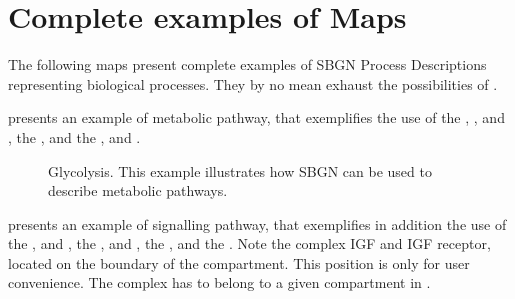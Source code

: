 \chapter{Complete examples of \PD Maps}

The following maps present complete examples of SBGN Process Descriptions representing biological processes. They by no mean exhaust the possibilities of  \SBGNPDLone.

 presents an example of metabolic pathway, that exemplifies the use of the  , , and , the  , and the  ,  and .

\begin{figure}[htb]
\begin{center}
\caption{Glycolysis. This example illustrates how SBGN can be used to describe metabolic pathways.}
\label{fig:glycolysis}
\end{center}
\end{figure}

 presents an example of signalling pathway, that exemplifies in addition the use of the  , and , the  ,  and , the  , and the  . Note the complex IGF and IGF receptor, located on the boundary of the compartment. This position is only for user convenience. The complex has to belong to a given compartment in \SBGNPDLone.

